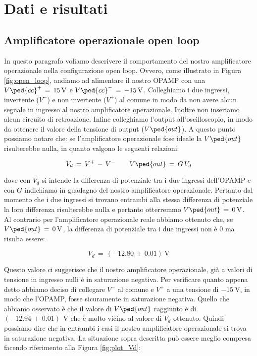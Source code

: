\section*{Dati e risultati}

\subsection*{Amplificatore operazionale open loop}

In questo paragrafo voliamo descrivere il comportamento del nostro amplificatore operazionale nella configurazione open loop. Ovvero, come illustrato in Figura \ref{fig:open_loop}, andiamo ad alimentare il nostro OPAMP con una $V\ped{cc}^+\,=\,\SI{+15}{\volt}$ e $V\ped{cc}^-\,=\,\SI{-15}{\volt}$. Colleghiamo i due ingressi, invertente ($V^-$) e non invertente ($V^+$) al comune in modo da non avere alcun segnale in ingresso al nostro amplificatore operazionale. Inoltre non inseriamo alcun circuito di retroazione. Infine colleghiamo l'output all'oscilloscopio, in modo da ottenere il valore della tensione di output ($V\ped{out}$).
A questo punto possiamo notare che: se l'amplificatore operazionale fose ideale la $V\ped{out}$ risulterebbe nulla, in quanto valgono le seguenti relazioni:

\begin{equation}
	V_d\,=\,V^+\,-\,V^- \qquad V\ped{out}\,=\,G\,V_d
\end{equation}

dove con $V_d$ si intende la differenza di potenziale tra i due ingressi dell'OPAMP e con $G$ indichiamo in guadagno del nostro amplificatore operazionale. Pertanto dal momento che i due ingressi si trovano entrambi alla stessa differenza di potenziale la loro differenza risulterebbe nulla e pertanto otterremmo $V\ped{out}\,=\,\SI{0}{\volt}$.
Al contrario per l'amplificatore operazionale reale abbiamo ottenuto che, se $V\ped{out}\,=\,\SI{0}{\volt}$, la differenza di potenziale tra i due ingressi non è 0 ma risulta essere:

\begin{equation}
	V_d\,=\,(-12.80\,\pm\,0.01) \SI{}{\volt}
\end{equation}

Questo valore ci suggerisce che il nostro amplificatore operazionale, già a valori di tensione in ingresso nulli è in saturazione negativa. Per verificare quanto appena detto abbiamo deciso di collegare $V^-$ al comune e $V^+$ a una tensione di $\SI{-15}{\volt}$, in modo che l'OPAMP, fosse sicuramente in saturazione negativa. Quello che abbiamo osservato è che il valore di $V\ped{out}$ raggiunto è di $(-12.94\,\pm\,0.01)\,\SI{}{\volt}$ che è molto vicino al valore di $V_d$ ottenuto. Quindi possiamo dire che in entrambi i casi il nostro amplificatore operazionale si trova in saturazione negativa.
La situazione sopra descritta può essere meglio compresa facendo riferimento alla Figura \ref{fig:plot_Vd}:

